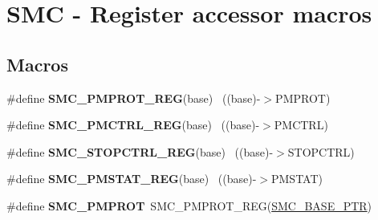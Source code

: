 \hypertarget{group___s_m_c___register___accessor___macros}{}\section{S\+M\+C -\/ Register accessor macros}
\label{group___s_m_c___register___accessor___macros}
\subsection*{Macros}
\begin{DoxyCompactItemize}
\item 
\hypertarget{group___s_m_c___register___accessor___macros_ga376601b24e540392f6d12424bdaebab4}{}\#define {\bfseries S\+M\+C\+\_\+\+P\+M\+P\+R\+O\+T\+\_\+\+R\+E\+G}(base)                                      ~((base)-\/$>$P\+M\+P\+R\+O\+T)\label{group___s_m_c___register___accessor___macros_ga376601b24e540392f6d12424bdaebab4}

\item 
\hypertarget{group___s_m_c___register___accessor___macros_gaa927c65bb4333cf1bcff0d5fa57d8034}{}\#define {\bfseries S\+M\+C\+\_\+\+P\+M\+C\+T\+R\+L\+\_\+\+R\+E\+G}(base)                                      ~((base)-\/$>$P\+M\+C\+T\+R\+L)\label{group___s_m_c___register___accessor___macros_gaa927c65bb4333cf1bcff0d5fa57d8034}

\item 
\hypertarget{group___s_m_c___register___accessor___macros_gaa5acb017ede815ab56f09a505bc276c2}{}\#define {\bfseries S\+M\+C\+\_\+\+S\+T\+O\+P\+C\+T\+R\+L\+\_\+\+R\+E\+G}(base)                                  ~((base)-\/$>$S\+T\+O\+P\+C\+T\+R\+L)\label{group___s_m_c___register___accessor___macros_gaa5acb017ede815ab56f09a505bc276c2}

\item 
\hypertarget{group___s_m_c___register___accessor___macros_ga77ded725e1d8ccc2781a0ee6dffc8809}{}\#define {\bfseries S\+M\+C\+\_\+\+P\+M\+S\+T\+A\+T\+\_\+\+R\+E\+G}(base)                                      ~((base)-\/$>$P\+M\+S\+T\+A\+T)\label{group___s_m_c___register___accessor___macros_ga77ded725e1d8ccc2781a0ee6dffc8809}

\item 
\hypertarget{group___s_m_c___register___accessor___macros_ga43f6628ef790c765722cee208c2c477d}{}\#define {\bfseries S\+M\+C\+\_\+\+P\+M\+P\+R\+O\+T}~S\+M\+C\+\_\+\+P\+M\+P\+R\+O\+T\+\_\+\+R\+E\+G(\hyperlink{group___s_m_c___peripheral_ga31b6c4571795341e6446800243313e56}{S\+M\+C\+\_\+\+B\+A\+S\+E\+\_\+\+P\+T\+R})\label{group___s_m_c___register___accessor___macros_ga43f6628ef790c765722cee208c2c477d}


\end{DoxyCompactItemize}
